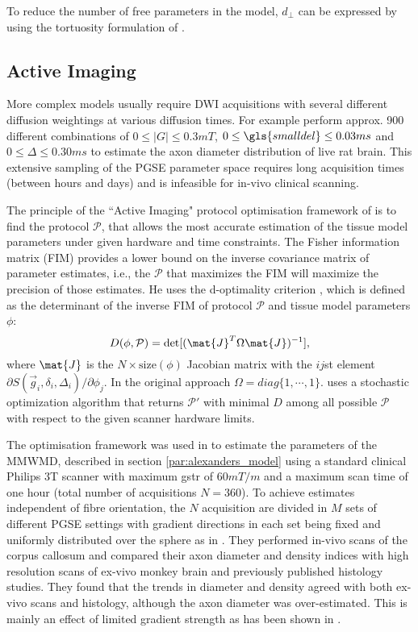 To reduce the number of free parameters in the model, $d_\perp$ can be expressed by using the tortuosity formulation of \citet{Szafer:1995}.

\subsection*{Active Imaging}
\label{sec:protocol_optimisation}
More complex models usually require  {\gls{DWI}}  acquisitions with several different diffusion weightings at various diffusion times. For example \citet{Barazany:2009} perform approx. 900 different combinations of $0\le|G|\le 0.3mT$, $0\le {\gls{smalldel}} \le 0.03ms$ and $0\le \Delta \le 0.30ms$ to estimate the axon diameter distribution of live rat brain. This extensive sampling of the \gls{PGSE} parameter space requires long acquisition times (between hours and days) and is infeasible for in-vivo clinical scanning. 

The principle of the ``Active Imaging" protocol optimisation framework of \cite{Alexander:2008} is to find the protocol $\mathcal{P}$, that allows the most accurate estimation of the tissue model parameters under given hardware and time constraints. The Fisher information matrix (FIM) provides a lower bound on the inverse covariance matrix of parameter estimates, i.e., the $\mathcal{P}$ that maximizes the FIM will maximize the precision of those estimates. He uses the d-optimality criterion \citep{OBrien:2003}, which is defined as the determinant of the inverse FIM of protocol $\mathcal{P}$ and tissue model parameters $\phi$:
\begin{equation}
	D(\phi,\mathcal{P})=\det[(\mat{J}^T\Omega\mat{J})^{-1}], 
	\label{eq-optimality}
\end{equation}
where $\mat{J}$ is the $N\times \mbox{size}(\phi)$ Jacobian matrix with the $ij$st element $\partial S(\vec{g}_i,\delta_i,\Delta_i) / \partial \phi_j$. In the original approach $\Omega=diag\{1,\cdots,1\}$. \citet{Alexander:2008} uses a stochastic optimization algorithm \citep{Zelinka:2010} that returns $\mathcal{P}'$ with minimal $D$ among all possible $\mathcal{P}$ with respect to the given scanner hardware limits.

The optimisation framework was used in \citet{Alexander:2010} to estimate the parameters of the \gls{MMWMD}, described in section \ref{par:alexanders_model} using a standard clinical Philips 3T scanner with maximum {\gls{gstr}} of $60mT/m$ and a maximum scan time of one hour (total number of acquisitions $N=360$). To achieve estimates independent of fibre orientation, the $N$ acquisition are divided in $M$ sets of different PGSE settings with gradient directions in each set being fixed and uniformly distributed over the sphere as in \cite{Jones:2004a}. They performed in-vivo scans of the corpus callosum and compared their axon diameter and density indices with high resolution scans of ex-vivo monkey brain and previously published histology studies. They found that the trends in diameter and density agreed with both ex-vivo scans and histology, although the axon diameter was over-estimated. This is mainly an effect of limited gradient strength as has been shown in \cite{Dyrby:2010}.  


